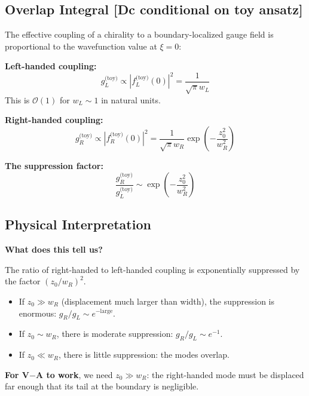 \subsection{Overlap Integral [Dc conditional on toy ansatz]}

The effective coupling of a chirality to a boundary-localized gauge field is
proportional to the wavefunction value at $\xi = 0$:

\textbf{Left-handed coupling:}
\begin{equation}
    g_L^{\text{(toy)}} \propto |f_L^{\text{(toy)}}(0)|^2 = \frac{1}{\sqrt{\pi} w_L}
    \label{eq:ch9_toy_gL}
\end{equation}
This is $\mathcal{O}(1)$ for $w_L \sim 1$ in natural units.

\textbf{Right-handed coupling:}
\begin{equation}
    g_R^{\text{(toy)}} \propto |f_R^{\text{(toy)}}(0)|^2
    = \frac{1}{\sqrt{\pi} w_R} \exp\left(-\frac{z_0^2}{w_R^2}\right)
    \label{eq:ch9_toy_gR}
\end{equation}

\textbf{The suppression factor:}
\begin{equation}
    \frac{g_R^{\text{(toy)}}}{g_L^{\text{(toy)}}} \sim \exp\left(-\frac{z_0^2}{w_R^2}\right)
    \label{eq:ch9_toy_suppression}
\end{equation}

\subsection{Physical Interpretation}

\textbf{What does this tell us?}

The ratio of right-handed to left-handed coupling is exponentially suppressed
by the factor $(z_0/w_R)^2$.

\begin{itemize}[nosep]
    \item If $z_0 \gg w_R$ (displacement much larger than width), the suppression
          is enormous: $g_R/g_L \sim e^{-\text{large}}$.
    \item If $z_0 \sim w_R$, there is moderate suppression: $g_R/g_L \sim e^{-1}$.
    \item If $z_0 \ll w_R$, there is little suppression: the modes overlap.
\end{itemize}

\textbf{For V$-$A to work}, we need $z_0 \gg w_R$: the right-handed mode must
be displaced far enough that its tail at the boundary is negligible.

